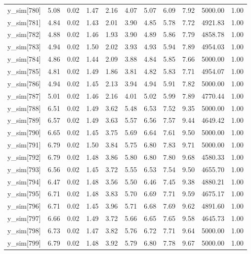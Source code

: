 \begin{table}[ht]
\begin{tabular}{rrrrrrrrrrr}
  y\_sim[780] & 5.08 & 0.02 & 1.47 & 2.16 & 4.07 & 5.07 & 6.09 & 7.92 & 5000.00 & 1.00 \\ 
  y\_sim[781] & 4.84 & 0.02 & 1.43 & 2.01 & 3.90 & 4.85 & 5.78 & 7.72 & 4921.83 & 1.00 \\ 
  y\_sim[782] & 4.88 & 0.02 & 1.46 & 1.93 & 3.90 & 4.89 & 5.86 & 7.79 & 4858.78 & 1.00 \\ 
  y\_sim[783] & 4.94 & 0.02 & 1.50 & 2.02 & 3.93 & 4.93 & 5.94 & 7.89 & 4954.03 & 1.00 \\ 
  y\_sim[784] & 4.86 & 0.02 & 1.44 & 2.09 & 3.88 & 4.84 & 5.85 & 7.66 & 5000.00 & 1.00 \\ 
  y\_sim[785] & 4.81 & 0.02 & 1.49 & 1.86 & 3.81 & 4.82 & 5.83 & 7.71 & 4954.07 & 1.00 \\ 
  y\_sim[786] & 4.94 & 0.02 & 1.45 & 2.13 & 3.94 & 4.94 & 5.91 & 7.82 & 5000.00 & 1.00 \\ 
  y\_sim[787] & 5.01 & 0.02 & 1.46 & 2.16 & 4.01 & 5.02 & 5.99 & 7.89 & 4770.44 & 1.00 \\ 
  y\_sim[788] & 6.51 & 0.02 & 1.49 & 3.62 & 5.48 & 6.53 & 7.52 & 9.35 & 5000.00 & 1.00 \\ 
  y\_sim[789] & 6.57 & 0.02 & 1.49 & 3.63 & 5.57 & 6.56 & 7.57 & 9.44 & 4649.42 & 1.00 \\ 
  y\_sim[790] & 6.65 & 0.02 & 1.45 & 3.75 & 5.69 & 6.64 & 7.61 & 9.50 & 5000.00 & 1.00 \\ 
  y\_sim[791] & 6.79 & 0.02 & 1.50 & 3.84 & 5.75 & 6.80 & 7.83 & 9.71 & 5000.00 & 1.00 \\ 
  y\_sim[792] & 6.79 & 0.02 & 1.48 & 3.86 & 5.80 & 6.80 & 7.80 & 9.68 & 4580.33 & 1.00 \\ 
  y\_sim[793] & 6.56 & 0.02 & 1.45 & 3.72 & 5.55 & 6.53 & 7.54 & 9.50 & 4655.70 & 1.00 \\ 
  y\_sim[794] & 6.47 & 0.02 & 1.48 & 3.56 & 5.50 & 6.46 & 7.45 & 9.38 & 4880.21 & 1.00 \\ 
  y\_sim[795] & 6.71 & 0.02 & 1.48 & 3.83 & 5.70 & 6.69 & 7.71 & 9.59 & 4675.17 & 1.00 \\ 
  y\_sim[796] & 6.71 & 0.02 & 1.45 & 3.96 & 5.71 & 6.68 & 7.69 & 9.62 & 4891.60 & 1.00 \\ 
  y\_sim[797] & 6.66 & 0.02 & 1.49 & 3.72 & 5.66 & 6.65 & 7.65 & 9.58 & 4645.73 & 1.00 \\ 
  y\_sim[798] & 6.73 & 0.02 & 1.47 & 3.82 & 5.76 & 6.72 & 7.71 & 9.64 & 5000.00 & 1.00 \\ 
  y\_sim[799] & 6.79 & 0.02 & 1.48 & 3.92 & 5.79 & 6.80 & 7.78 & 9.67 & 5000.00 & 1.00 \\ 

\end{tabular}
\end{table}
